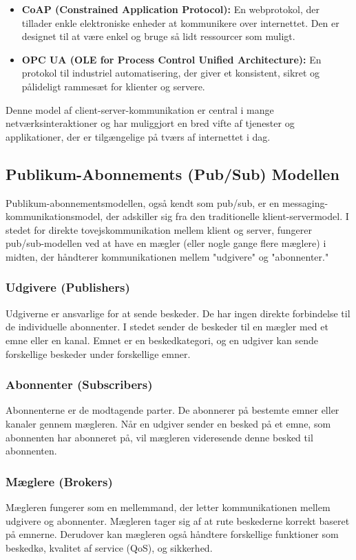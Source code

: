 \begin{enumerate}
\begin{itemize}
		\item \textbf{CoAP (Constrained Application Protocol):} En webprotokol, der tillader enkle elektroniske enheder at kommunikere over internettet. Den er designet til at være enkel og bruge så lidt ressourcer som muligt.
		\item \textbf{OPC UA (OLE for Process Control Unified Architecture):} En protokol til industriel automatisering, der giver et konsistent, sikret og pålideligt rammesæt for klienter og servere.
	\end{itemize}	
	Denne model af client-server-kommunikation er central i mange netværksinteraktioner og har muliggjort en bred vifte af tjenester og applikationer, der er tilgængelige på tværs af internettet i dag.
	
	\subsection{Publikum-Abonnements (Pub/Sub) Modellen}
	Publikum-abonnementsmodellen, også kendt som pub/sub, er en messaging-kommunikationsmodel, der adskiller sig fra den traditionelle klient-servermodel. I stedet for direkte tovejskommunikation mellem klient og server, fungerer pub/sub-modellen ved at have en mægler (eller nogle gange flere mæglere) i midten, der håndterer kommunikationen mellem "udgivere" og "abonnenter."
	\subsubsection{Udgivere (Publishers)}
	Udgiverne er ansvarlige for at sende beskeder. De har ingen direkte forbindelse til de individuelle abonnenter. I stedet sender de beskeder til en mægler med et emne eller en kanal. Emnet er en beskedkategori, og en udgiver kan sende forskellige beskeder under forskellige emner.
	\subsubsection{Abonnenter (Subscribers)}
	Abonnenterne er de modtagende parter. De abonnerer på bestemte emner eller kanaler gennem mægleren. Når en udgiver sender en besked på et emne, som abonnenten har abonneret på, vil mægleren videresende denne besked til abonnenten.
	\subsubsection{Mæglere (Brokers)}	
	Mægleren fungerer som en mellemmand, der letter kommunikationen mellem udgivere og abonnenter. Mægleren tager sig af at rute beskederne korrekt baseret på emnerne. Derudover kan mægleren også håndtere forskellige funktioner som beskedkø, kvalitet af service (QoS), og sikkerhed.

\end{enumerate}
